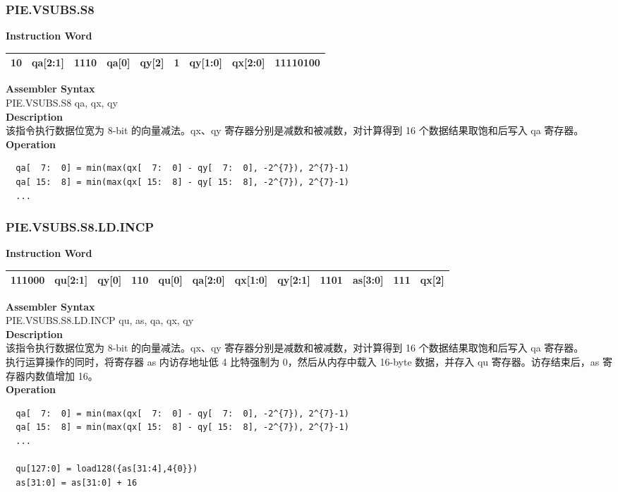 \newpage
\subsubsection{PIE.VSUBS.S8}\label{instruction:PIEVSUBSS8}
\setlength\tabcolsep{6pt}
\textbf{Instruction Word} \\
\begin{tabular}{|c|c|c|c|c|c|c|c|c|}
	\hline
	10 & qa[2:1] & 1110 & qa[0] & qy[2] & 1 & qy[1:0] & qx[2:0] & 11110100 \\
	\hline
\end{tabular}

\textbf{Assembler Syntax} \\
PIE.VSUBS.S8 qa, qx, qy \\
\textbf{Description} \\
该指令执行数据位宽为 8-bit 的向量减法。qx、qy 寄存器分别是减数和被减数，对计算得到 16 个数据结果取饱和后写入 qa 寄存器。\\
\textbf{Operation}
\begin{lstlisting}
  qa[  7:  0] = min(max(qx[  7:  0] - qy[  7:  0], -2^{7}), 2^{7}-1)
  qa[ 15:  8] = min(max(qx[ 15:  8] - qy[ 15:  8], -2^{7}), 2^{7}-1)
  ...
\end{lstlisting}

\newpage
\subsubsection{PIE.VSUBS.S8.LD.INCP}\label{instruction:PIEVSUBSS8LDINCP}
\setlength\tabcolsep{6pt}
\textbf{Instruction Word} \\
\begin{tabular}{|c|c|c|c|c|c|c|c|c|c|c|c|}
	\hline
	111000 & qu[2:1] & qy[0] & 110 & qu[0] & qa[2:0] & qx[1:0] & qy[2:1] & 1101 & as[3:0] & 111 & qx[2] \\
	\hline
\end{tabular}

\textbf{Assembler Syntax} \\
PIE.VSUBS.S8.LD.INCP qu, as, qa, qx, qy \\
\textbf{Description} \\
该指令执行数据位宽为 8-bit 的向量减法。qx、qy 寄存器分别是减数和被减数，对计算得到 16 个数据结果取饱和后写入 qa 寄存器。\\ 执行运算操作的同时，将寄存器 as 内访存地址低 4 比特强制为 0，然后从内存中载入 16-byte 数据，并存入 qu 寄存器。访存结束后，as 寄存器内数值增加 16。\\
\textbf{Operation}
\begin{lstlisting}
  qa[  7:  0] = min(max(qx[  7:  0] - qy[  7:  0], -2^{7}), 2^{7}-1)
  qa[ 15:  8] = min(max(qx[ 15:  8] - qy[ 15:  8], -2^{7}), 2^{7}-1)
  ...

  qu[127:0] = load128({as[31:4],4{0}})
  as[31:0] = as[31:0] + 16
\end{lstlisting}

